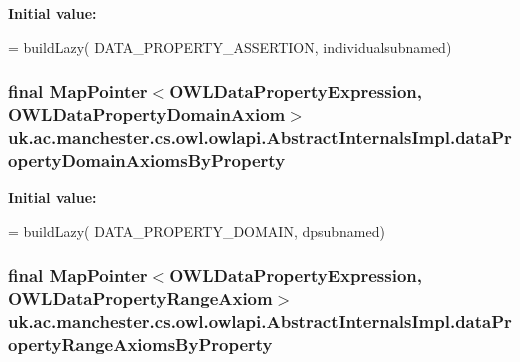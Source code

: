 {\bfseries Initial value\-:}
\begin{DoxyCode}
= buildLazy(
            DATA\_PROPERTY\_ASSERTION, individualsubnamed)
\end{DoxyCode}
\hypertarget{classuk_1_1ac_1_1manchester_1_1cs_1_1owl_1_1owlapi_1_1_abstract_internals_impl_aa5ed486038f750b54814572c6ea549ce}{
\subsubsection[{data\-Property\-Domain\-Axioms\-By\-Property}]{\setlength{\rightskip}{0pt plus 5cm}final Map\-Pointer$<${\bf O\-W\-L\-Data\-Property\-Expression}, {\bf O\-W\-L\-Data\-Property\-Domain\-Axiom}$>$ uk.\-ac.\-manchester.\-cs.\-owl.\-owlapi.\-Abstract\-Internals\-Impl.\-data\-Property\-Domain\-Axioms\-By\-Property\hspace{0.3cm}{\ttfamily [protected]}}}\label{classuk_1_1ac_1_1manchester_1_1cs_1_1owl_1_1owlapi_1_1_abstract_internals_impl_aa5ed486038f750b54814572c6ea549ce}
{\bfseries Initial value\-:}
\begin{DoxyCode}
= buildLazy(
            DATA\_PROPERTY\_DOMAIN, dpsubnamed)
\end{DoxyCode}
\hypertarget{classuk_1_1ac_1_1manchester_1_1cs_1_1owl_1_1owlapi_1_1_abstract_internals_impl_abec29ad2cb4d4f327268abfcc20512eb}{
\subsubsection[{data\-Property\-Range\-Axioms\-By\-Property}]{\setlength{\rightskip}{0pt plus 5cm}final Map\-Pointer$<${\bf O\-W\-L\-Data\-Property\-Expression}, {\bf O\-W\-L\-Data\-Property\-Range\-Axiom}$>$ uk.\-ac.\-manchester.\-cs.\-owl.\-owlapi.\-Abstract\-Internals\-Impl.\-data\-Property\-Range\-Axioms\-By\-Property\hspace{0.3cm}{\ttfamily [protected]}}}\label{classuk_1_1ac_1_1manchester_1_1cs_1_1owl_1_1owlapi_1_1_abstract_internals_impl_abec29ad2cb4d4f327268abfcc20512eb}
